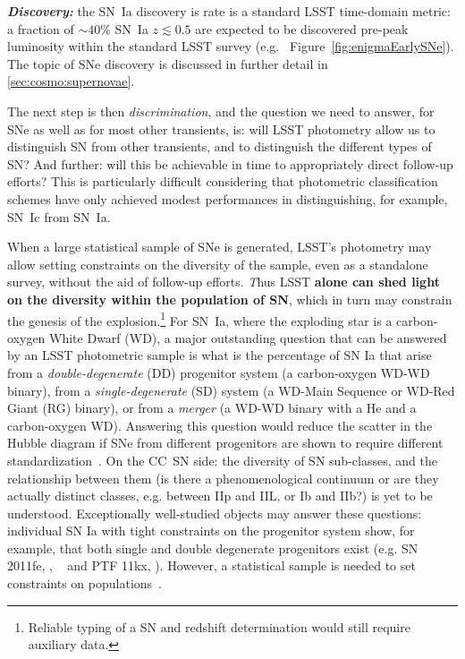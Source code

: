 {\bf \emph{Discovery:}} the SN~Ia discovery is rate is a standard LSST time-domain metric: a
fraction of $\sim40\%$ SN~Ia $z\lesssim0.5$ are expected to be discovered pre-peak
luminosity within the standard LSST survey
(e.g. ~Figure~\ref{fig:enigmaEarlySNe}). The
topic of SNe discovery is discussed in further detail in
\autoref{sec:cosmo:supernovae}.

The next step is then {\emph{discrimination}}, and the question we need
to answer, for SNe as well as for most other transients, is: will LSST
photometry allow us to distinguish SN from other transients, and to
distinguish the different types of SN? And further: will this be
achievable in time to appropriately direct follow-up efforts? This is
particularly difficult considering that photometric classification
schemes have only achieved modest performances in distinguishing, for
example, SN~Ic from SN~Ia.

When a large statistical sample of SNe is generated, LSST's photometry
may allow setting constraints on the diversity of the sample, even as a
standalone survey, without the aid of follow-up efforts.  {\emph Thus
  LSST \bf{alone} can shed light on the diversity within the
  population of SN}, which in turn may constrain the genesis of the
explosion.\footnote{Reliable typing of a SN and redshift determination
  would still require auxiliary data.} For SN~Ia, where the exploding
star is a carbon-oxygen White Dwarf (WD), a major outstanding question
that can be answered by an LSST photometric sample is
what is the percentage of SN Ia that arise from a
\emph{double-degenerate} (DD) progenitor system (a carbon-oxygen WD-WD
binary), from a \emph {single-degenerate} (SD) system (a WD-Main Sequence
 or WD-Red Giant (RG) binary), or from a \emph{merger} (a WD-WD
 binary with a He and a carbon-oxygen WD).
 Answering this question would reduce the
scatter in the Hubble diagram if SNe from different progenitors are
shown to require different standardization~\citep{Scolnic2014}. On the
CC~SN side: the diversity of SN sub-classes, and the relationship
between them (is there a phenomenological continuum or are they actually
distinct classes, e.g. between IIp and IIL, or Ib and IIb?) is yet to
be understood. Exceptionally well-studied objects may answer these
questions: individual SN Ia with tight constraints on the progenitor
system show, for example, that both single and double degenerate
progenitors exist (e.g. SN 2011fe, \citealt{Li11}, ~\citealt{Olling15}
and PTF 11kx, \citealt{Dilday12}). However, a statistical sample is
needed to set constraints on populations~\citep{Hayden2010, Bianco11}.

